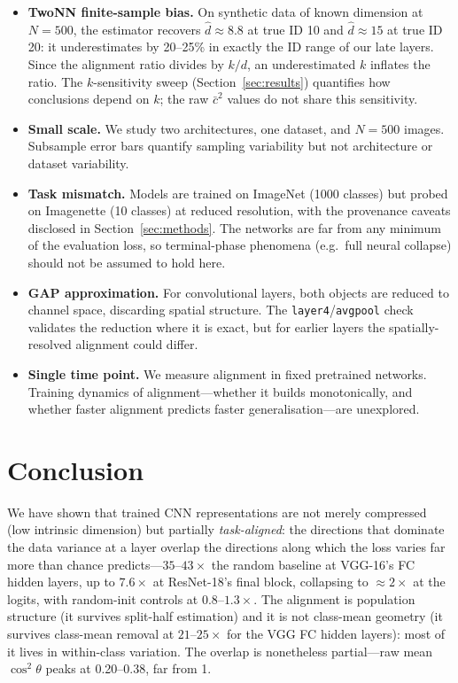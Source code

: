 \documentclass{article}
\newcommand{\kcos}{\bar{c}^2}           %
\begin{document}
\begin{itemize}
\item \textbf{TwoNN finite-sample bias.}  On synthetic data of known
  dimension at $N=500$, the estimator recovers $\hat d \approx 8.8$ at true
  ID 10 and $\hat d \approx 15$ at true ID 20: it underestimates by
  20--25\% in exactly the ID range of our late layers.  Since the alignment
  ratio divides by $k/d$, an underestimated $k$ inflates the ratio.  The
  $k$-sensitivity sweep (Section~\ref{sec:results}) quantifies how
  conclusions depend on $k$; the raw $\kcos$ values do not share this
  sensitivity.

\item \textbf{Small scale.}  We study two architectures, one dataset, and
  $N=500$ images.  Subsample error bars quantify sampling variability but
  not architecture or dataset variability.

\item \textbf{Task mismatch.}  Models are trained on ImageNet (1000 classes)
  but probed on Imagenette (10 classes) at reduced resolution, with the
  provenance caveats disclosed in Section~\ref{sec:methods}.  The networks
  are far from any minimum of the evaluation loss, so terminal-phase
  phenomena (e.g.\ full neural collapse) should not be assumed to hold here.

\item \textbf{GAP approximation.}  For convolutional layers, both objects
  are reduced to channel space, discarding spatial structure.  The
  \texttt{layer4}/\texttt{avgpool} check validates the reduction where it is
  exact, but for earlier layers the spatially-resolved alignment could
  differ.

\item \textbf{Single time point.}  We measure alignment in fixed
  pretrained networks.  Training dynamics of alignment---whether it builds
  monotonically, and whether faster alignment predicts faster
  generalisation---are unexplored.
\end{itemize}

\section{Conclusion}
\label{sec:conclusion}

We have shown that trained CNN representations are not merely compressed
(low intrinsic dimension) but partially \emph{task-aligned}: the directions
that dominate the data variance at a layer overlap the directions along
which the loss varies far more than chance predicts---$35$--$43\times$ the
random baseline at VGG-16's FC hidden layers, up to $7.6\times$ at
ResNet-18's final block, collapsing to ${\approx}2\times$ at the logits,
with random-init controls at $0.8$--$1.3\times$.  The alignment is
population structure (it survives split-half estimation) and it is not
class-mean geometry (it survives class-mean removal at $21$--$25\times$ for
the VGG FC hidden layers): most of it lives in within-class variation.  The
overlap is nonetheless partial---raw mean $\cos^2\theta$ peaks at
0.20--0.38, far from 1.
\end{document}
